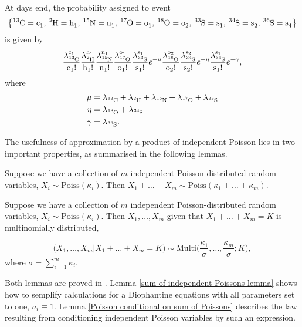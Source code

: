 At days end, the probability assigned to event
\begin{equation*}
 	\left\{ \cem{^{13}C} = \cem{c_1},\, \cem{^{2}H} = \cem{h_1},\, \cem{^{15}N} = \cem{n_1},\, \cem{^{17}O} = \cem{o_1},\, \cem{^{18}O} = \cem{o_2},\, \cem{^{33}S} = \cem{s_1},\, \cem{^{34}S} = \cem{s_2},\, \cem{^{36}S}= \cem{s_4} \right\}	
\end{equation*} 
is given by
\begin{equation}\label{QK Nominator}
	\poiss{\text{c}}{13}{1}
	\poiss{\text{h}}{2}{1}
	\poiss{\text{n}}{15}{1}
	\poiss{\text{o}}{17}{1}
	\poiss{\text{s}}{33}{1}
		e^{ - \mu}
	\poiss{\text{o}}{18}{2}	
	\poiss{\text{s}}{34}{2}
		e^{ - \eta }		
	\poiss{\text{s}}{36}{1}
		e^{ - \gamma },
\end{equation}
where 
\begin{align*}\label{intensities summed equation}
	\mu 	&=	\lambda_\cem{^{13}C} + \lambda_\cem{^{2}H} + \lambda_\cem{^{15}N} + \lambda_\cem{^{17}O} +\lambda_\cem{^{33}S}  	\\
	\eta 	&= 	\lambda_\cem{^{18}O} + \lambda_\cem{^{34}S}\\ 
	\gamma	&= 	\lambda_\cem{^{36}S}.
\end{align*}

The usefulness of approximation by a product of independent Poisson lies in two important properties, as summarised in the following lemmas.

\begin{lemma}\label{sum of independent Poissons lemma}
	Suppose we have a collection of $m$ independent Poisson-distributed random variables, $X_i \sim \mathrm{Poiss}(\kappa_i)$. Then $X_1 + \dots + X_m \sim \mathrm{Poiss}(\kappa_1 + \dots + \kappa_m)$. 
\end{lemma}  

\begin{lemma}\label{Poisson conditional on sum of Poissons}
	Suppose we have a collection of $m$ independent Poisson-distributed random variables, $X_i \sim \mathrm{Poiss}(\kappa_i)$. Then $X_1, \dots, X_m$ given that $X_1 + \dots + X_m = K$ is multinomially distributed,

$$ 
	\Big(X_1, \dots, X_m | X_1 + \dots + X_m = K \Big) 
	\sim 
	\mathrm{Multi}\Big( \frac{\kappa_1}{\sigma}, \dots, \frac{\kappa_m}{\sigma}; K \Big), 
$$
	where $\sigma = \sum_{i = 1}^m \kappa_i$.	
\end{lemma}
Both lemmas are proved in \cite{Kingman1993PoissonProcesses}. Lemma \ref{sum of independent Poissons lemma} shows how to semplify calculations for a Diophantine equations with all parameters set to one, $a_i \equiv 1$. Lemma \ref{Poisson conditional on sum of Poissons} describes the law resulting from conditioning independent Poisson variables by such an expression. 

